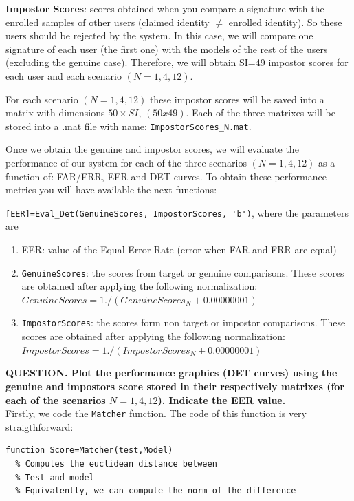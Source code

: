 \documentclass[a4paper]{article}
\def\inline{\lstinline[basicstyle=\ttfamily,keywordstyle={}]}
\begin{document}
{\textbf{Impostor Scores}: scores obtained when you compare a signature with the enrolled samples of other users (claimed identity $\neq$ enrolled identity). So these users should be rejected by the system. In this case, we will compare one signature of each user (the first one) with the models of the rest of the users (excluding the genuine case). Therefore, we will obtain SI=49 impostor scores for each user and each scenario \((N=1,4,12)\). 

For each scenario \((N=1,4,12)\) these impostor scores will be saved into a matrix with dimensions \(50\times SI\), \((50x49)\). Each of the three matrixes will be stored into a .mat file with name: \inline{ImpostorScores_N.mat}.

Once we obtain the genuine and impostor scores, we will evaluate the performance of our system for each of the three scenarios \((N=1,4,12)\) as a function of: FAR/FRR, EER and DET curves.
To obtain these performance metrics you will have available the next functions:



\inline{[EER]=Eval_Det(GenuineScores, ImpostorScores, 'b')}, where the parameters are
\begin{enumerate}
\item	EER: value of the Equal Error Rate (error when FAR and FRR are equal)
\item	\inline{GenuineScores}: the scores from target or genuine comparisons. These scores are obtained after applying the following normalization: \(GenuineScores = 1./(GenuineScores_N+0.00000001)\)
\item	\inline{ImpostorScores}: the scores form non target or impostor comparisons. These scores are obtained after applying the following normalization: \(ImpostorScores =1./(ImpostorScores_N+0.00000001)\)
\end{enumerate}

\textbf{QUESTION. Plot the performance graphics (DET curves) using the genuine and impostors score stored in their respectively matrixes (for each of the scenarios \(N=1,4,12\)). Indicate the EER value.} \\

Firstly, we code the \inline{Matcher} function. The code of this function is very straigthforward:

\begin{verbatim}
function Score=Matcher(test,Model)
  % Computes the euclidean distance between
  % Test and model
  % Equivalently, we can compute the norm of the difference


\end{verbatim}}
\end{document}
